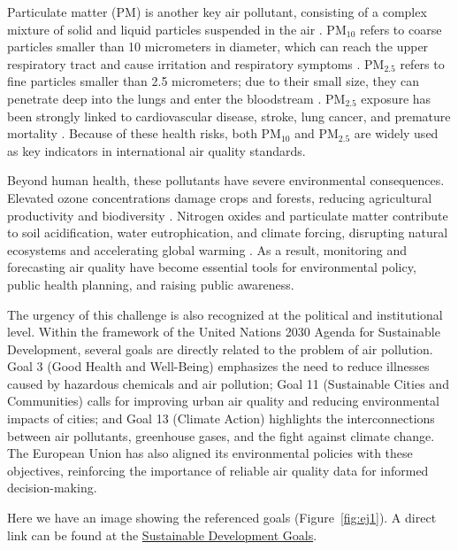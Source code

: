 Particulate matter (PM) is another key air pollutant, consisting of a complex mixture of solid and liquid particles suspended in the air \cite{whoTypesPollutants}. 
PM$_{10}$ refers to coarse particles smaller than 10 micrometers in diameter, which can reach the upper respiratory tract and cause irritation and respiratory symptoms \cite{zarkeba2024relationship}. 
PM$_{2.5}$ refers to fine particles smaller than 2.5 micrometers; due to their small size, they can penetrate deep into the lungs and enter the bloodstream \cite{xie2021toxicity}. 
PM$_{2.5}$ exposure has been strongly linked to cardiovascular disease, stroke, lung cancer, and premature mortality \cite{thangavel2022recent}. 
Because of these health risks, both PM$_{10}$ and PM$_{2.5}$ are widely used as key indicators in international air quality standards.

Beyond human health, these pollutants have severe environmental consequences. Elevated ozone concentrations damage crops and forests, reducing agricultural productivity and biodiversity \cite{agathokleous2020ozone}. 
Nitrogen oxides and particulate matter contribute to soil acidification, water eutrophication, and climate forcing, disrupting natural ecosystems and accelerating global warming \cite{europaQualityEurope}. 
As a result, monitoring and forecasting air quality have become essential tools for environmental policy, public health planning, and raising public awareness.

The urgency of this challenge is also recognized at the political and institutional level. Within the framework of the United Nations 2030 Agenda for Sustainable Development, several goals are directly related to the problem of air pollution. Goal 3 (Good Health and Well-Being) emphasizes the need to reduce illnesses caused by hazardous chemicals and air pollution; Goal 11 (Sustainable Cities and Communities) calls for improving urban air quality and reducing environmental impacts of cities; and Goal 13 (Climate Action) highlights the interconnections between air pollutants, greenhouse gases, and the fight against climate change. The European Union has also aligned its environmental policies with these objectives, reinforcing the importance of reliable air quality data for informed decision-making.


Here we have an image showing the referenced goals (Figure~\ref{fig:ej1}). 
A direct link can be found at the \href{https://sdgs.un.org/goals}{Sustainable Development Goals}.


